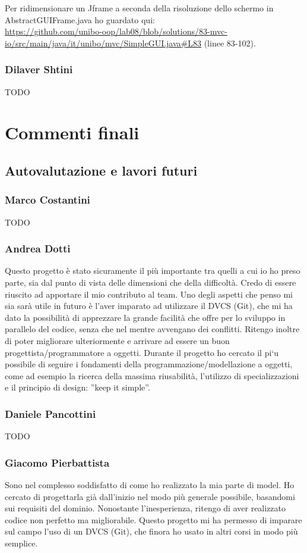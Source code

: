\documentclass[a4paper,12pt]{report}
\begin{document}
Per ridimensionare un Jframe a seconda della risoluzione dello schermo in AbstractGUIFrame.java ho guardato qui: 
\\\url{https://github.com/unibo-oop/lab08/blob/solutions/83-mvc-io/src/main/java/it/unibo/mvc/SimpleGUI.java#L83} (linee 83-102).

\subsection*{Dilaver Shtini}
{TODO}



\chapter{Commenti finali}

\section{Autovalutazione e lavori futuri}
\subsection*{Marco Costantini}
{TODO}

\subsection*{Andrea Dotti}
Questo progetto è stato sicuramente il più importante tra quelli a cui io ho preso parte, sia dal punto di vista delle dimensioni che della difficoltà. Credo di essere riuscito ad apportare il mio contributo al team. Uno degli aspetti che penso mi sia sarà utile in futuro è l’aver imparato ad utilizzare il DVCS (Git), che mi ha dato la possibilità di apprezzare la grande facilità che offre per lo sviluppo in parallelo del codice, senza che nel mentre avvengano dei conflitti. Ritengo inoltre di poter migliorare ulteriormente e arrivare ad essere un buon progettista/programmatore a oggetti. Durante il progetto ho cercato il pi`u possibile di seguire i fondamenti della programmazione/modellazione a oggetti, come ad esempio la ricerca della massima riusabilità, l’utilizzo di specializzazioni e il principio di design: ”keep it simple”.

\subsection*{Daniele Pancottini}
{TODO}

\subsection*{Giacomo Pierbattista}
Sono nel complesso soddisfatto di come ho realizzato la mia parte di model. Ho cercato di
progettarla già dall'inizio nel modo più generale possibile, basandomi sui requisiti del dominio.
Nonostante l'inesperienza, ritengo di aver realizzato codice non perfetto ma migliorabile.
Questo progetto mi ha permesso di imparare sul campo l'uso di un DVCS (Git), che finora ho usato
in altri corsi in modo più semplice.
\end{document}
